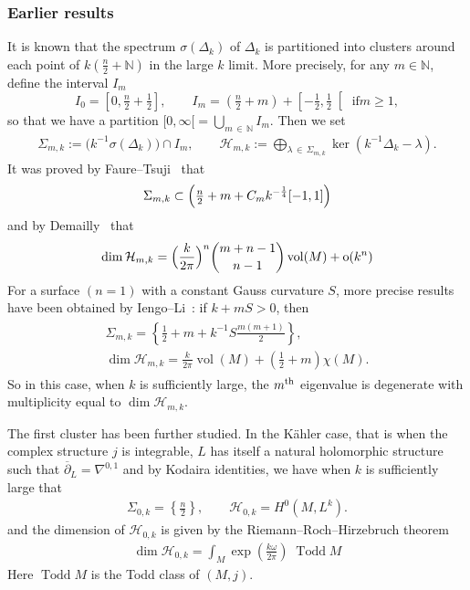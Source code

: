 \documentclass[10pt,a4paper]{article}
\theoremstyle{definition}
\numberwithin{equation}{section}
\newcommand{\N}{{\mathbb{N}}}
\newcommand{\la}{{\lambda}}
\newcommand{\si}{{\sigma}}
\newcommand{\om}{{\omega}}
\newcommand{\Si}{{\Sigma}}
\newcommand{\con}{\overline}
\newcommand{\op}{\operatorname}
\newcommand{\Hilb}{\mathcal{H}}
\begin{document}
\subsubsection*{Earlier results}

It is known that the spectrum $\si (\Delta_k)$ of $\Delta_k$ is partitioned into clusters around each point of $k (\frac{n}{2} + \N)$ in the large $k$ limit. More precisely, for any $m \in \N$, define the interval $I_m$
\[
I_0 = \left[0, \tfrac{n}{2} + \tfrac{1}{2}\right], \qquad I_m = \left(\tfrac{n}{2} +m\right) + \left[-\tfrac{1}{2}, \tfrac{1}{2} \right[\text{ if
} m \geqslant 1,
\]
so that we have a partition $[0,\infty [= \bigcup _{m\,\in\,\N} I_m$. Then we set
\begin{gather}\label{eq:def_Landau}
\Si_{m,k} := \bigl(k^{-1} \si (\Delta_k) \bigr) \cap I_m, \qquad \Hilb_{m,k} := \bigoplus_{\la\,\in\,\Si_{m,k}} \ker \left(k^{-1}\Delta_k - \la\right).
\end{gather}
It was proved by Faure--Tsuji~\cite{FaTs15} that
\begin{gather}\label{eq:Si_m:Faure_Tsujii}
\Si_{m,k} \subset
\Bigl(\tfrac{n}{2}+ m + C_m k^{-\frac{1}{4}} [-1,1] \Bigr)
\end{gather}
and by Demailly~\cite{Dem} that
\begin{gather}\label{eq:asymptot_Demailly}
\op{dim} \Hilb_{m,k} = \Bigl(\frac{k}{2 \pi} \Bigr)^n \binom{ {m+n-1}}{{n-1} } \op{vol} (M) + \op{o} (k^n)
\end{gather}
For a surface $(n=1)$ with a constant Gauss curvature $S$, more precise results have been obtained by Iengo--Li~\cite{IeLi94}: if $k + m S >0$, then
\begin{gather}\label{eq:surface_eignvalue_dim}
\begin{split}
\Si_{m,k} = \left\{ \tfrac{1}{2} + m + k^{-1} S \tfrac{m(m+1)}{2} \right\}, \\
\op{dim} \Hilb_{m,k} = \tfrac{k}{2 \pi} \op{vol} (M) + \left(\tfrac{1}{2} + m\right)
\chi (M).
\end{split}
\end{gather}
So in this case, when $k$ is sufficiently large, the $m^{\rm th}$ eigenvalue is degenerate with multiplicity equal to $\op{dim} \Hilb_{m,k}$.

The first cluster has been further studied. In the K\"ahler case, that is when the complex structure $j$ is integrable, $L$ has itself a natural holomorphic structure such that $\con{\partial}_L = \nabla^{0,1}$ and by Kodaira identities, we have when $k$ is sufficiently large that
\begin{gather}
\Si_{0,k} = \left\{ \tfrac{n}{2} \right\}, \qquad \Hilb_{0,k} = H^0 \left(M, L^k\right).
\end{gather}
and the dimension of $\Hilb_{0,k}$ is given by the Riemann--Roch--Hirzebruch theorem
\begin{gather}\label{eq:RRH}
\dim \Hilb_{0,k} = \int_M \exp \left(\frac{k\om}{2\pi} \right) \; \op{Todd} M
\end{gather}
Here $\op{Todd} M$ is the Todd class of $(M,j)$.
\end{document}
